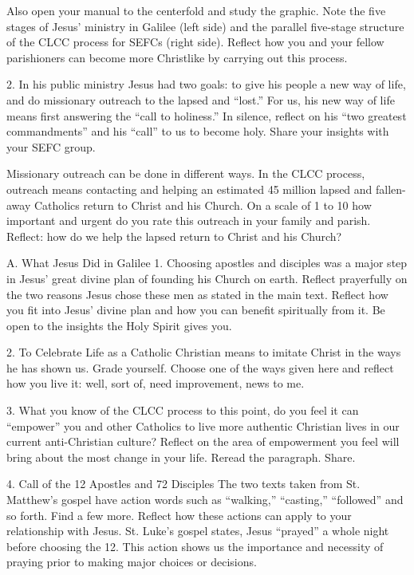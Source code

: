 \documentclass[oneside]{book}
\begin{document}
Also open your manual to the centerfold and study the graphic. Note the five
stages of Jesus' ministry in Galilee (left side) and the parallel five-stage
structure of the CLCC process for SEFCs (right side). Reflect how you and your
fellow parishioners can become more Christlike by carrying out this process.

2. In his public ministry Jesus had two goals: to give his people a new way of
life, and do missionary outreach to the lapsed and ``lost.'' For us, his new way
of life means first answering the ``call to holiness.'' In silence, reflect on
his ``two greatest commandments'' and his ``call'' to us to become holy. Share
your insights with your SEFC group.

Missionary outreach can be done in different ways. In the CLCC process, outreach
means contacting and helping an estimated 45 million lapsed and fallen-away
Catholics return to Christ and his Church. On a scale of 1 to 10 how important
and urgent do you rate this outreach in your family and parish. Reflect: how do
we help the lapsed return to Christ and his Church?

A. What Jesus Did in Galilee
1. Choosing apostles and disciples was a major step in Jesus' great divine plan
of founding his Church on earth. Reflect prayerfully on the two reasons Jesus
chose these men as stated in the main text. Reflect how you fit into Jesus'
divine plan and how you can benefit spiritually from it. Be open to the insights
the Holy Spirit gives you.

2. To Celebrate Life as a Catholic Christian means to imitate Christ in the ways
he has shown us. Grade yourself. Choose one of the ways given here and reflect
how you live it: well, sort of, need improvement, news to me.

3. What you know of the CLCC process to this point, do you feel it can
``empower'' you and other Catholics to live more authentic Christian lives in
our current anti-Christian culture? Reflect on the area of empowerment you feel
will bring about the most change in your life. Reread the paragraph. Share.

4. Call of the 12 Apostles and 72 Disciples
The two texts taken from St. Matthew's gospel have action words such as
``walking,'' ``casting,'' ``followed'' and so forth. Find a few more. Reflect
how these actions can apply to your relationship with Jesus. St. Luke's gospel
states, Jesus ``prayed'' a whole night before choosing the 12. This action shows
us the importance and necessity of praying prior to making major choices or
decisions.
\end{document}
